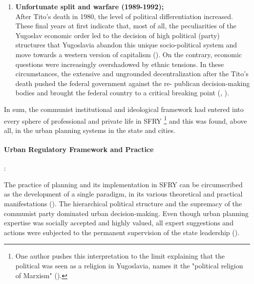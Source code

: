 \documentclass[11pt]{report}
\begin{document}
\begin{enumerate}
\item \textbf{Unfortunate split and warfare (1989-1992);}
\\
After Tito’s death in 1980, the level of political differentiation increased. These final years at first indicate that, most of all, the peculiarities of the Yugoslav economic order led to the decision of high political (party) structures that Yugoslavia abandon this unique socio-political system and move towards a western version of capitalism (\href{Estrin}{\citealt{estrin_yugoslavia:_1991}}).
On the contrary, economic questions were increasingly overshadowed by ethnic tensions. In these circumstances, the extensive and ungrounded decentralization after the Tito’s death pushed the federal government against the re- publican decision-making bodies and brought the federal country to a critical breaking point (\href{Estrin}{\citealt{estrin_yugoslavia:_1991}}, \href{Vujosevic}{\citealt{vujosevic_post-socialist_2012}}).
\end{enumerate}

In sum, the communist institutional and ideological framework had entered into every sphere of professional and private life in SFRY
\footnote{One author pushes this interpretation to the limit explaining that the political was seen as a religion in Yugoslavia, names it the "political religion of Marxism" (\href{Doytchinov}{\citealt{doytchinov_belgrade_2015}}).}
and this was found, above all, in the urban planning systems in the state and cities.

\paragraph{Urban Regulatory Framework and Practice}:

The  practice  of  planning  and  its  implementation  in  SFRY  can  be  circumscribed  as the  development  of  a single  paradigm,  in  its  various  theoretical  and  practical  manifestations  (\href{Vukmirovic}{\citealt{vukmirovic_city_2013}}).
The hierarchical political structure and the supremacy of the communist party dominated urban decision-making.
Even though urban planning expertise was socially accepted and highly valued, all expert suggestions and actions were subjected to the permanent supervision of the state leadership (\href{Piha}{\citealt{piha_osnove_1986}}).
\\
\end{document}
